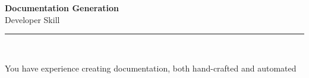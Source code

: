 \documentclass[11pt,a4paper]{memoir}
\begin{document}
    \begin{Spacing}{0.75}%
        \noindent
        \large
        \textbf{Documentation Generation}\\[3pt]
        \scriptsize\color{gray}Developer Skill\\ 
        \rule{\textwidth}{.3mm}\\
        
        \vspace{3mm}
        \noindent
        \begin{minipage}[t]{53mm}
            \begin{flushleft}
            {
                \normalsize
                \begin{Spacing}{1}%
                \color{black}\textrm{You have experience creating documentation, both hand-crafted and automated}\\
                \end{Spacing}
            }
            \end{flushleft}
        \end{minipage}

        \vspace{5mm}
        \noindent
        \begin{minipage}[t]{53mm}
            \begin{flushleft}
            {
                \normalsize
                \begin{Spacing}{1}%
                \color{gray}\textit{}\\
                \end{Spacing}
            }
            \end{flushleft}
        \end{minipage}
    \end{Spacing}
    \clearpage
\end{document}
